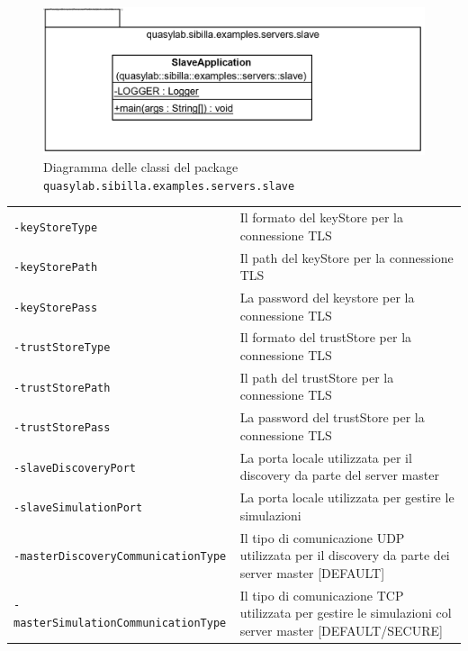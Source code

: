 \begin{figure}[H]
    \includegraphics[width=\linewidth]{images/quasylab.sibilla.examples.servers.slave.png}
    \captionsetup{justification=centering}
    \caption{Diagramma delle classi del package \texttt{quasylab.sibilla.examples.servers.slave}}
  \end{figure}

\begin{table}[H]
    \begin{tabularx}{\linewidth}{ l X }
        \texttt{-keyStoreType}        & Il formato del keyStore per la connessione TLS       \\
        \texttt{-keyStorePath}        & Il path del keyStore per la connessione TLS           \\
        \texttt{-keyStorePass}        & La password del keystore per la connessione TLS        \\
        \texttt{-trustStoreType}      & Il formato del trustStore per la connessione TLS     \\
        \texttt{-trustStorePath}      & Il path del trustStore per la connessione TLS         \\
        \texttt{-trustStorePass}      & La password del trustStore per la connessione TLS     \\
        \texttt{-slaveDiscoveryPort}                & La porta locale utilizzata per il discovery da parte del server master                                              \\
        \texttt{-slaveSimulationPort} & La porta locale utilizzata per gestire le simulazioni \\
        \texttt{-masterDiscoveryCommunicationType}  & Il tipo di comunicazione UDP utilizzata per il discovery da parte dei server master {[}DEFAULT{]}               \\
        \texttt{-masterSimulationCommunicationType} & Il tipo di comunicazione TCP utilizzata per gestire le simulazioni col server master {[}DEFAULT/SECURE{]}
    \end{tabularx}
\end{table}